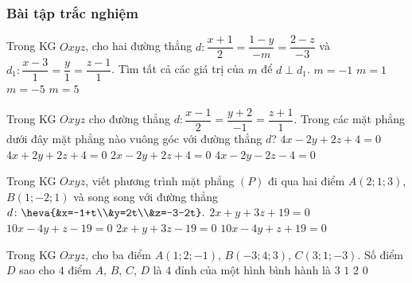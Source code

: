 	\subsubsection{Bài tập trắc nghiệm}
	\setcounter{ex}{0}
	\begin{ex}%
	Trong KG $Oxyz$, cho hai đường thẳng $d:\dfrac{x+1}{2}=\dfrac{1-y}{-m}=\dfrac{2-z}{-3}$ và $d_{1}:\dfrac{x-3}{1}=\dfrac{y}{1}=\dfrac{z-1}{1}$. Tìm tất cả các giá trị của $m$ để $d\perp d_{1}$.
	\choice
	{$m=-1$}
	{$m=1$}
	{\True $m=-5$}
	{$m=5$}
	\end{ex}
	\begin{ex}%
	Trong KG $Oxyz$ cho đường thẳng $d\colon \dfrac{x-1}{2}=\dfrac{y+2}{-1}=\dfrac{z+1}{1}.$ Trong các mặt phẳng dưới đây mặt phẳng nào vuông góc với đường thẳng $d$?
	\choice
	{\True $4x-2y+2z+4=0$}
	{$4x+2y+2z+4=0$}
	{$2x-2y+2z+4=0$}
	{$4x-2y-2z-4=0$}
	\end{ex}
	\begin{ex}%
	Trong KG $Oxyz$, viết phương trình mặt phẳng $(P)$ đi qua hai điểm $A(2;1;3)$, $B(1;-2;1)$ và song song với đường thẳng $d\colon \heva{&x=-1+t\\&y=2t\\&z=-3-2t}.$
	\choice
	{$2x+y+3z+19=0$}
	{\True $10x-4y+z-19=0$}
	{$2x+y+3z-19=0$}
	{$10x-4y+z+19=0$}
	\end{ex}
	\begin{ex} %
	Trong KG $Oxyz$, cho ba điểm $A(1; 2; -1)$, $B(-3; 4; 3)$, $C(3; 1; -3)$. Số điểm $D$ sao cho $4$ điểm $A$, $B$, $C$, $D$ là $4$ đỉnh của một hình bình hành là
	\choice
	{$3$}
	{$1$}
	{$2$}
	{\True $0$}
	\end{ex}
